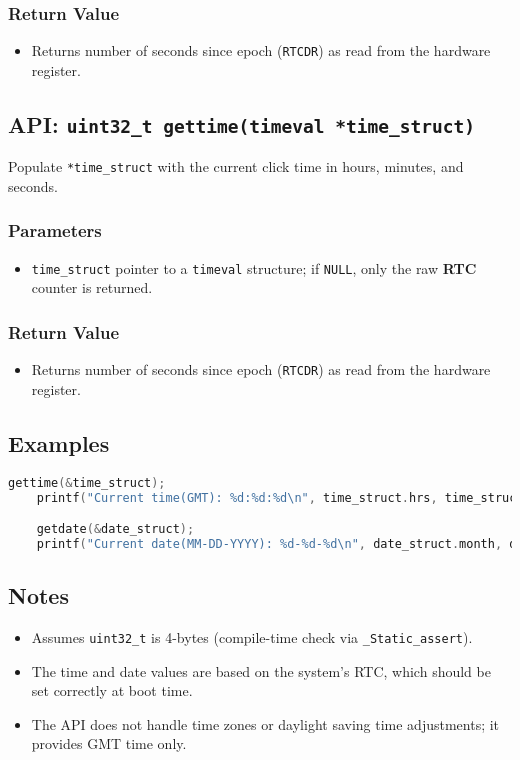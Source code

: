 \subsubsection*{Return Value}
\begin{itemize}
    \item Returns number of seconds since epoch (\texttt{RTCDR}) as read from the hardware register.
\end{itemize}

\subsection{API: \texttt{uint32\_t gettime(timeval *time\_struct)}}
Populate \texttt{*time\_struct} with the current click time in hours, minutes, and seconds.

\subsubsection*{Parameters}
\begin{itemize}
    \item \texttt{time\_struct} pointer to a \texttt{timeval} structure; if \texttt{NULL}, 
    only the raw \textbf{RTC} counter is returned.
\end{itemize}

\subsubsection*{Return Value}
\begin{itemize}
    \item Returns number of seconds since epoch (\texttt{RTCDR}) as read from the hardware register.
\end{itemize}

\subsection*{Examples}

\begin{lstlisting}[language=C, caption={Examples of getdate and gettime usage in AstraKernel.}, label={lst:datetime_examples}]
    gettime(&time_struct);
    printf("Current time(GMT): %d:%d:%d\n", time_struct.hrs, time_struct.mins, time_struct.secs);

    getdate(&date_struct);
    printf("Current date(MM-DD-YYYY): %d-%d-%d\n", date_struct.month, date_struct.day, date_struct.year);
\end{lstlisting}

\subsection*{Notes}
\begin{itemize}
    \item Assumes \texttt{uint32\_t} is 4-bytes (compile-time check via \texttt{\_Static\_assert}).
    \item The time and date values are based on the system's RTC, which should be set 
    correctly at boot time.
    \item The API does not handle time zones or daylight saving time adjustments; it 
    provides GMT time only.
\end{itemize}